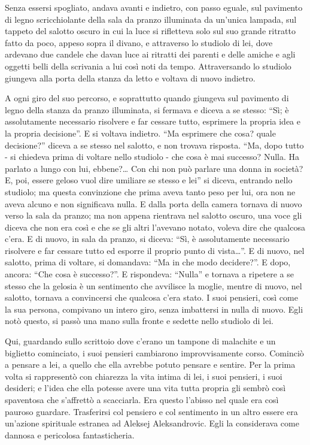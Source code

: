 Senza essersi spogliato, andava avanti e indietro, con passo eguale, sul pavimento di legno scricchiolante della sala da pranzo illuminata da un'unica lampada, sul tappeto del salotto oscuro in cui la luce si rifletteva solo sul suo grande ritratto fatto da poco, appeso sopra il divano, e attraverso lo studiolo di lei, dove ardevano due candele che davan luce ai ritratti dei parenti e delle amiche e agli oggetti belli della scrivania a lui così noti da tempo. Attraversando lo studiolo giungeva alla porta della stanza da letto e voltava di nuovo indietro. 

A ogni giro del suo percorso, e soprattutto quando giungeva sul pavimento di legno della stanza da pranzo illuminata, si fermava e diceva a se stesso: ``Sì; è assolutamente necessario risolvere e far cessare tutto, esprimere la propria idea e la propria decisione''. E si voltava indietro. ``Ma esprimere che cosa? quale decisione?'' diceva a se stesso nel salotto, e non trovava risposta. ``Ma, dopo tutto - si chiedeva prima di voltare nello studiolo - che cosa è mai successo? Nulla. Ha parlato a lungo con lui, ebbene?\ldots{} Con chi non può parlare una donna in società? E, poi, essere geloso vuol dire umiliare se stesso e lei'' si diceva, entrando nello studiolo; ma questa convinzione che prima aveva tanto peso per lui, ora non ne aveva alcuno e non significava nulla. E dalla porta della camera tornava di nuovo verso la sala da pranzo; ma non appena rientrava nel salotto oscuro, una voce gli diceva che non era così e che se gli altri l'avevano notato, voleva dire che qualcosa c'era. E di nuovo, in sala da pranzo, si diceva: ``Sì, è assolutamente necessario risolvere e far cessare tutto ed esporre il proprio punto di vista\ldots{}''. E di nuovo, nel salotto, prima di voltare, si domandava: ``Ma in che modo decidere?''. E dopo, ancora: ``Che cosa è successo?''. E rispondeva: ``Nulla'' e tornava a ripetere a se stesso che la gelosia è un sentimento che avvilisce la moglie, mentre di nuovo, nel salotto, tornava a convincersi che qualcosa c'era stato. I suoi pensieri, così come la sua persona, compivano un intero giro, senza imbattersi in nulla di nuovo. Egli notò questo, si passò una mano sulla fronte e sedette nello studiolo di lei. 

Qui, guardando sullo scrittoio dove c'erano un tampone di malachite e un biglietto cominciato, i suoi pensieri cambiarono improvvisamente corso. Cominciò a pensare a lei, a quello che ella avrebbe potuto pensare e sentire. Per la prima volta si rappresentò con chiarezza la vita intima di lei, i suoi pensieri, i suoi desideri; e l'idea che ella potesse avere una vita tutta propria gli sembrò così spaventosa che s'affrettò a scacciarla. Era questo l'abisso nel quale era così pauroso guardare. Trasferirsi col pensiero e col sentimento in un altro essere era un'azione spirituale estranea ad Aleksej Aleksandrovic. Egli la considerava come dannosa e pericolosa fantasticheria. 

